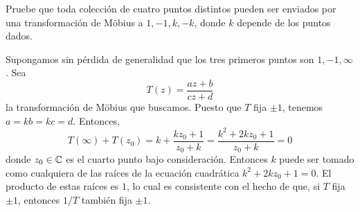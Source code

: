 \begin{exercise}
Pruebe que toda colección de cuatro puntos distintos pueden ser enviados por una transformación de Möbius a $1, -1, k, -k$, donde $k$ depende de los puntos dados.
\end{exercise}

\begin{solution}
Supongamos sin pérdida de generalidad que los tres primeros puntos son $1, -1, \infty$. Sea
$$T(z) = \frac {az + b} {cz + d}$$
la transformación de Möbius que buscamos. Puesto que $T$ fija $\pm 1$, tenemos $a = kb = kc = d$. Entonces,
$$
T(\infty) + T(z_0)
    = k + \frac {k z_0 + 1} {z_0 + k}
    = \frac {k^2 + 2kz_0 + 1} {z_0 + k}
    = 0
$$
donde $z_0 \in \mathbb C$ es el cuarto punto bajo consideración. Entonces $k$ puede ser tomado como cualquiera de las raíces de la ecuación cuadrática $k^2 + 2kz_0 + 1 = 0$. El producto de estas raíces es $1$, lo cual es consistente con el hecho de que, si $T$ fija $\pm 1$, entonces $1/T$ también fija $\pm 1$.
\end{solution}
